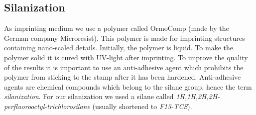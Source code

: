 \subsection{Silanization}
As imprinting medium we use a polymer called OrmoComp (made by the German company Microresist). This polymer is made for imprinting structures containing nano-scaled details. Initially, the polymer is liquid. To make the polymer solid it is cured with UV-light after imprinting. To improve the quality of the results it is important to use an anti-adhesive agent which prohibits the polymer from sticking to the stamp after it has been hardened. Anti-adhesive agents are chemical compounds which belong to the silane group, hence the term \textit{silanization}. For our silanization we used a silane called \textit{1H,1H,2H,2H-perfluorooctyl-trichlorosilane} (usually shortened to \textit{F13-TCS}).
